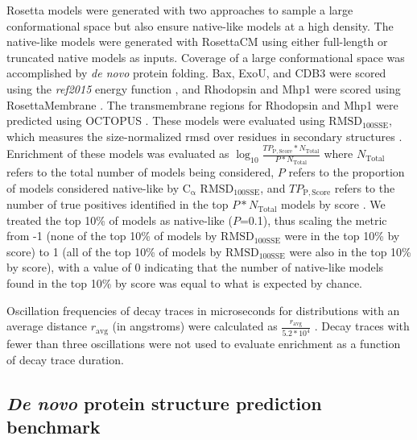 Rosetta models were generated with two approaches to sample a large conformational space but also ensure native-like models at a high density. The native-like models were generated with RosettaCM \citep*{Song2013} using either full-length or truncated native models as inputs. Coverage of a large conformational space was accomplished by \emph{de novo} protein folding. Bax, ExoU, and CDB3 were scored using the \emph{ref2015} energy function \citep*{Alford2017}, and Rhodopsin and Mhp1 were scored using RosettaMembrane \citep*{Yarov-Yarovoy2006}. The transmembrane regions for Rhodopsin and Mhp1 were predicted using OCTOPUS \citep*{Viklund2008}. These models were evaluated using $\mathrm{RMSD_{100SSE}}$, which measures the size-normalized \gls{rmsd} over residues in secondary structures \citep*{Carugo2002}. Enrichment of these models was evaluated as $\log_{10} \frac{TP_{\mathup{P,Score}}*N_{\mathup{Total}}}{P*N_{\mathup{Total}}}$ ⁡where $N_{\mathup{Total}}$ refers to the total number of models being considered, $P$ refers to the proportion of models considered native-like by $\mathrm{C_{\upalpha}}$ $\mathrm{RMSD_{100SSE}}$, and $TP_{\mathup{P,Score}}$ refers to the number of true positives identified in the top $P*N_{\mathup{Total}}$ models by score \citep*{Fischer2015}. We treated the top 10\% of models as native-like ($P$=0.1), thus scaling the metric from -1 (none of the top 10\% of models by $\mathrm{RMSD_{100SSE}}$ were in the top 10\% by score) to 1 (all of the top 10\% of models by $\mathrm{RMSD_{100SSE}}$ were also in the top 10\% by score), with a value of 0 indicating that the number of native-like models found in the top 10\% by score was equal to what is expected by chance.

Oscillation frequencies of decay traces in microseconds for distributions with an average distance $r_{\mathup{avg}}$ (in angstroms) were calculated as $\frac{r_{\mathup{avg}}}{5.2*10^{4}}$  \citep*{Hustedt2018}. Decay traces with fewer than three oscillations were not used to evaluate enrichment as a function of decay trace duration.

\subsection{\emph{De novo} protein structure prediction benchmark}

